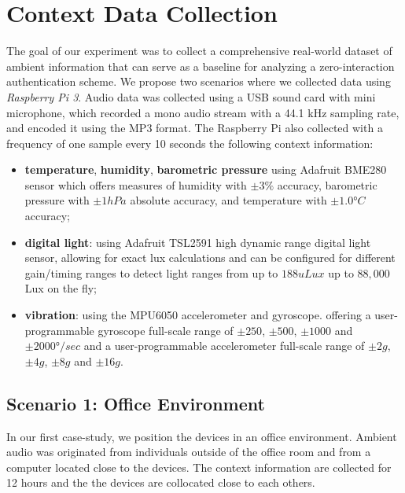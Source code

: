 \section{Context Data Collection}
The goal of our experiment was to collect a comprehensive real-world dataset of ambient information that can serve as a baseline for analyzing a zero-interaction authentication scheme. 
We propose two scenarios where we collected data using  \textit{Raspberry Pi 3}. 
Audio data was collected using a USB sound card with mini microphone, which recorded a mono audio stream with a 44.1 kHz sampling rate, and encoded it using the MP3 format. 
The Raspberry Pi also collected with a frequency of one sample every 10 seconds the following context information:
\begin{itemize}
    \item \textbf{temperature}, \textbf{humidity}, \textbf{barometric pressure} using Adafruit BME280 sensor which offers measures of humidity with $ \pm 3 \%$ accuracy, barometric pressure with $\pm 1 hPa$ absolute accuracy, and temperature with $\pm 1.0°C $ accuracy;
    \item \textbf{digital light}: using Adafruit TSL2591 high dynamic range digital light sensor, allowing for exact lux calculations and can be configured for different gain/timing ranges to detect light ranges from up to $188uLux$ up to $88,000$ Lux on the fly;
    \item \textbf{vibration}: using the MPU6050 accelerometer and gyroscope. offering a user-programmable gyroscope full-scale  range of  $\pm 250$, $\pm 500$, $\pm 1000$ and $\pm 2000°/sec $ and a user-programmable accelerometer full-scale range of $\pm 2g$, $\pm 4g$, $\pm 8g$ and $\pm 16g$.
\end{itemize}



 
\subsection{Scenario 1: Office Environment}
In our first case-study, we position the devices in an office environment. 
Ambient audio was originated from individuals outside of the office room and from a computer located close to the devices. 
The context information are collected for 12 hours and the the devices are collocated close to each others.

